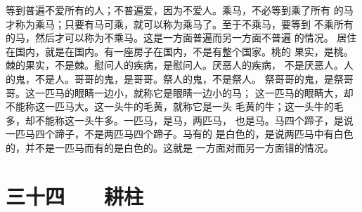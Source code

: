 \documentclass[12pt,UTF8]{ctexbook}
\begin{document}
等到普遍不爱所有的人；不普遍爱，因为不爱人。乘马，不必等到乘了所有 
的马才称为乘马；只要有马可乘，就可以称为乘马了。至于不乘马，要等到 
不乘所有的马，然后才可以称为不乘马。这是一方面普遍而另一方面不普遍 
的情况。 
居住在国内，就是在国内。有一座房子在国内，不是有整个国家。桃的 
果实，是桃。棘的果实，不是棘。慰问人的疾病，是慰问人。厌恶人的疾病， 
不是厌恶人。人的鬼，不是人。哥哥的鬼，是哥哥。祭人的鬼，不是祭人。 
祭哥哥的鬼，是祭哥哥。这一匹马的眼睛一边小，就称它是眼睛一边小的马； 
这一匹马的眼睛大，却不能称这一匹马大。这一头牛的毛黄，就称它是一头 
毛黄的牛；这一头牛的毛多，却不能称这一头牛多。一匹马，是马，两匹马， 
也是马。马四个蹄子，是说一匹马四个蹄子，不是两匹马四个蹄子。马有的 
是白色的，是说两匹马中有白色的，并不是一匹马而有的是白色的。这就是 
一方面对而另一方面错的情况。 

\chapter{三十四　　耕柱}
\end{document}
